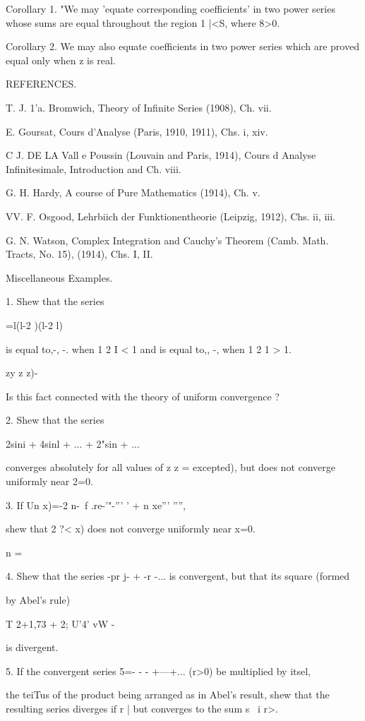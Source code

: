Corollary 1. "We may 'equate corresponding coefficients' in two power
series whose sums are equal throughout the region 1 |<S, where 8>0.

Corollary 2. We may also equate coefficients in two power series which
are proved equal only when z is real.

REFERENCES.

T. J. 1'a. Bromwich, Theory of Infinite Series (1908), Ch. vii.

E. Goursat, Cours d'Analyse (Paris, 1910, 1911), Chs. i, xiv.

C J. DE LA Vall e Poussin (Louvain and Paris, 1914), Cours d Analyse
Infinitesimale, Introduction and Ch. viii.

G. H. Hardy, A course of Pure Mathematics (1914), Ch. v.

VV. F. Osgood, Lehrbiich der Funktionentheorie (Leipzig, 1912), Chs.
ii, iii.

G. N. Watson, Complex Integration and Cauchy's Theorem (Camb. Math.
Tracts, No. 15), (1914), Chs. I, II.

Miscellaneous Examples.

1. Shew that the series

 =l(l-2 )(l-2 l)

is equal to,-, -. when 1 2 I < 1 and is equal to,, -, when 1 2 1 >
1.

  zy z z)-

Is this fact connected with the theory of uniform convergence ?

2. Shew that the series

2sini + 4sinl + ... + 2"sin + ...

converges absolutely for all values of z z = excepted), but does not
converge uniformly near 2=0.

3. If Un x)=-2 n-\ f .re-'"-''' ' + n xe''' '''',

shew that 2 ?< x) does not converge uniformly near x=0.

n = \

4. Shew that the series -pr j- + -r -... is convergent, but that its
square (formed

by Abel's rule)

T 2+1,73 + 2; U'4' vW -

is divergent.

5. If the convergent series 5=- - - +---+... (r>0) be multiplied by
itsel,

the teiTus of the product being arranged as in Abel's result, shew
that the resulting series diverges if r | but converges to the sum s \
i r>. 

